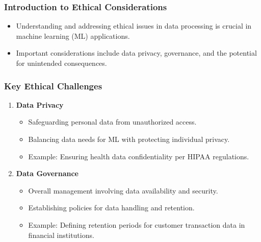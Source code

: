 \documentclass[aspectratio=169]{beamer}
\begin{document}
\begin{frame}[fragile]
    \frametitle{Introduction to Ethical Considerations}
    \begin{itemize}
        \item Understanding and addressing ethical issues in data processing is crucial in machine learning (ML) applications.
        \item Important considerations include data privacy, governance, and the potential for unintended consequences.
    \end{itemize}
\end{frame}

\begin{frame}[fragile]
    \frametitle{Key Ethical Challenges}
    \begin{enumerate}
        \item \textbf{Data Privacy}
            \begin{itemize}
                \item Safeguarding personal data from unauthorized access.
                \item Balancing data needs for ML with protecting individual privacy.
                \item Example: Ensuring health data confidentiality per HIPAA regulations.
            \end{itemize}
        \item \textbf{Data Governance}
            \begin{itemize}
                \item Overall management involving data availability and security.
                \item Establishing policies for data handling and retention.
                \item Example: Defining retention periods for customer transaction data in financial institutions.
            \end{itemize}
    \end{enumerate}
\end{frame}
\end{document}
